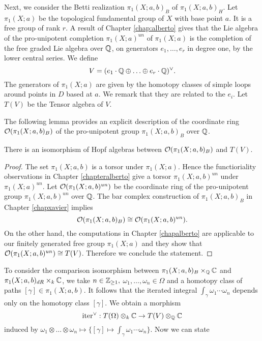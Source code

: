 Next, we consider the Betti realization $\pi_1(X;a,b)_{B}$ of $\pi_1(X;a,b)_{H}$. 
Let $\pi_1(X;a)$ be the topological fundamental group of $X$ with base point $a$. 
It is a free group of rank $r$. 
A result of Chapter \ref{chap:alberto} gives that the Lie algebra of the pro-unipotent completion $\pi_1(X;a)^{un}$ of $\pi_1(X;a)$ is the completion of the free graded Lie algebra over $\mathbb{Q}$,
on generators $e_1,\dotsc,e_r$ in degree one, by the lower central series.  We define $$V=(e_1\cdot\mathbb{Q}\oplus\dotsc\oplus e_r\cdot\mathbb{Q})^{\vee}.$$ 
The generators of $\pi_1(X;a)$ are given by the homotopy classes of simple loops around points in $D$ based at $a$. 
We remark that they are related to the $e_i$. Let $T(V)$ be the Tensor algebra of $V$.

The following lemma provides an explicit description of the coordinate ring  $\mathcal{O}(\pi_1(X;a,b)_{B})$ of the pro-unipotent group $\pi_1(X;a,b)_{B}$ over $\mathbb{Q}$.

\begin{lemma}\label{lem:explicitbetti}
There is an isomorphism of Hopf algebras between $\mathcal{O}(\pi_1(X;a,b)_{B})$ and $T(V).$
\end{lemma}
\begin{proof}
The set $\pi_1(X;a,b)$ is a torsor under $\pi_1(X;a)$. Hence the functioriality observations in Chapter \ref{chapteralberto} give a torsor $\pi_1(X;a,b)^{un}$ under  $\pi_1(X;a)^{un}$. 
Let $\mathcal{O}(\pi_1(X;a,b)^{un})$  be the coordinate ring of the pro-unipotent group $\pi_1(X;a,b)^{un}$ over $\mathbb{Q}$.
The bar complex construction of $\pi_1(X;a,b)_{B}$ in Chapter \ref{chapxavier} implies  $$\mathcal{O}(\pi_1(X;a,b)_{B})\cong\mathcal{O}(\pi_1(X;a,b)^{un}).$$  
On the other hand, the computations in Chapter \ref{chapalberto} are applicable to our finitely generated free group $\pi_1(X;a)$ and they show that $\mathcal{O}(\pi_1(X;a,b)^{un})\cong T(V)$. Therefore we conclude the statement.
\end{proof}

To consider the comparison isomorphism between 
$\pi_1(X;a,b)_{B}\times_{\mathbb{Q}} \mathbb{C}$ and  $\pi_1(X;a,b)_{dR}\times_k \mathbb{C}$, we take $n\in \mathbb{Z}_{\geq 1},$ $\omega_1,\dotsc,\omega_n\in \Omega$  and a homotopy class of paths $[\gamma]\in \pi_1(X;a,b)$. 
It follows that the iterated integral $\int_{\gamma}\omega_1\cdots\omega_n$ depends only on the homotopy class $[\gamma]$. We obtain a morphism
$$\mathrm{iter}^{\vee}: T(\Omega)\otimes_k \mathbb{C}\to T(V)\otimes_{\mathbb{Q}} \mathbb{C}$$
induced by $\omega_1\otimes\dotsc\otimes\omega_n\mapsto \{[\gamma]\mapsto \int_{\gamma}\omega_1\cdots\omega_n \}$. Now we can state

